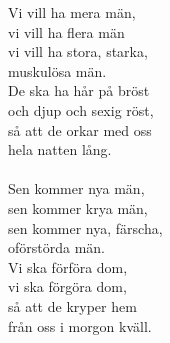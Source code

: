 
            Vi vill ha mera män,  \\
            vi vill ha flera män  \\
            vi vill ha stora, starka,  \\
            muskulösa män.  \\
            De ska ha hår på bröst  \\
            och djup och sexig röst,  \\
            så att de orkar med oss  \\
            hela natten lång. \\
\hspace{10mm} \\
            Sen kommer nya män,  \\
            sen kommer krya män,  \\
            sen kommer nya, färscha,  \\
            oförstörda män. \\
            Vi ska förföra dom,  \\
            vi ska förgöra dom,  \\
            så att de kryper hem  \\
            från oss i morgon kväll. \\
